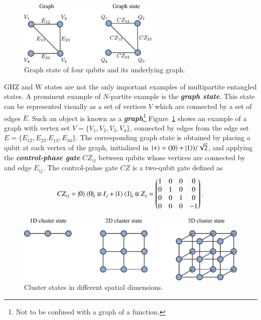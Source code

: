 \begin{figure}[t]
    \centering
    \includegraphics[width=0.6\textwidth]{lesson14/14-2_graph_state.pdf}
    \caption[Graph state.]{Graph state of four qubits and its underlying graph.}
    \label{fig:14-2_graph_state}
\end{figure}

GHZ and W states are not the only important examples of multipartite entangled states.
A prominent example of $N$-partite example is the \textbf{\textit{graph state}}.
This state can be represented visually as a set of vertices $V$ which are connected by a set of edges $E$.
Such an object is known as a \textit{\textbf{graph}}\footnote{Not to be confused with a graph of a function.}
Figure~\ref{fig:14-2_graph_state} shows an example of a graph with vertex set $V=\{V_1, V_2, V_3, V_4\}$, connected by edges from the edge set $E=\{ E_{12}, E_{23}. E_{13}, E_{34} \}$.
The corresponding graph state is obtained by placing a qubit at each vertex of the graph, initialized in $\left| + \right\rangle = (\left| 0 \right\rangle + \left| 1 \right\rangle) / \sqrt{2}$, and applying the \textbf{\textit{control-phase gate}} $CZ_{ij}$ between qubits whose vertices are connected by and edge $E_{ij}$.
The control-pahse gate $CZ$ is a two-qubit gate defined as
\begin{equation}
    CZ_{ij} = \left| 0 \right\rangle\left\langle 0 \right|_i \otimes I_j + \left| 1 \right\rangle\left\langle 1 \right|_i \otimes Z_j = \begin{pmatrix}
        1 & 0 & 0 & 0 \\
        0 & 1 & 0 & 0 \\
        0 & 0 & 1 & 0 \\
        0 & 0 & 0 & -1
    \end{pmatrix}.
\end{equation}
\begin{figure}[t]
    \centering
    \includegraphics[width=\textwidth]{lesson14/14-2_cluster_state.pdf}
    \caption[Cluster state.]{Cluster states in different spatial dimensions.}
    \label{fig:14-2_cluster_state}
\end{figure}
